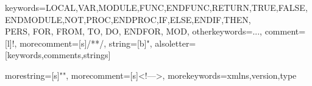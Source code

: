 



%


%
{
	keywords={LOCAL,VAR,MODULE,FUNC,ENDFUNC,RETURN,TRUE,FALSE,ENDMODULE,NOT,PROC,ENDPROC,IF,ELSE,ENDIF,THEN,\\PERS, FOR, FROM, TO, DO, ENDFOR, MOD},
	otherkeywords={...},
	comment=[l]{!},%
	morecomment=[s]{/*}{*/},%
	string=[b]{"},%
	alsoletter={\\}
}[keywords,comments,strings]%

{
	morestring=[s]{"}{"},
	morecomment=[s]{<!--}{-->},
	morekeywords={xmlns,version,type}%
}

%

